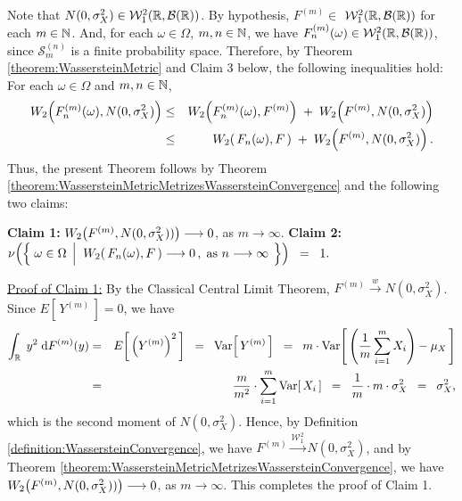 \noindent
Note that $N(0,\sigma^{2}_{X}) \in \mathcal{W}^{2}_{1}\!\left(\mathbb{R},\mathcal{B}(\mathbb{R})\right)$.
By hypothesis, $F^{(m)} \in$ $\mathcal{W}^{2}_{1}\!\left(\mathbb{R},\mathcal{B}(\mathbb{R})\right)$ for each $m \in \mathbb{N}$.
And, for each $\omega \in \Omega$, $m, n \in \mathbb{N}$, we have $F^{(m)}_{n}(\omega) \in \mathcal{W}^{2}_{1}\!\left(\mathbb{R},\mathcal{B}(\mathbb{R})\right)$,
since $\mathcal{S}^{(n)}_{m}$ is a finite probability space.
Therefore, by Theorem \ref{theorem:WassersteinMetric} and Claim 3 below, the following inequalities hold:
For each $\omega \in \Omega$ and $m, n \in \mathbb{N}$,
\begin{eqnarray*}
W_{2}\!\left(F^{(m)}_{n}(\omega),N(0,\sigma^{2}_{X})\right)
& \leq & W_{2}\!\left(F^{(m)}_{n}(\omega),F^{(m)}\right) \;+\; W_{2}\!\left(F^{(m)},N(0,\sigma^{2}_{X})\right) \\
& \leq & W_{2}\!\left(\,F_{n}(\omega),F\,\right) \;+\; W_{2}\!\left(F^{(m)},N(0,\sigma^{2}_{X})\right).
\end{eqnarray*}
Thus, the present Theorem follows by Theorem \ref{theorem:WassersteinMetricMetrizesWassersteinConvergence}
and the following two claims:
\vskip 0.5cm
\begin{center}
\begin{minipage}{5in}
\noindent
\textbf{Claim 1:}\;\; $W_{2}\!\left(F^{(m)},N(0,\sigma^{2}_{X}))\right) \longrightarrow 0$,\; as $m \longrightarrow \infty$.
\vskip 0.3cm
\textbf{Claim 2:}\;\;
	$
	\nu\!\left(\left\{\;
	\omega \in \Omega
	\;\left\vert\;\;
	W_{2}\!\left(\,F_{n}(\omega), F\,\right) \overset{\textnormal{\color{white}X}}{\longrightarrow} 0\,,
	\;\textnormal{as $n\longrightarrow\infty$}
	\right.
	\;\right\}\right)
	\;\; = \;\; 1.
	$
\end{minipage}
\end{center}

\vskip 0.8cm
\noindent
\underline{Proof of Claim 1:}\;\;
By the Classical Central Limit Theorem, $F^{(m)} \overset{w}{\longrightarrow} N(0,\sigma^{2}_{X})$.
Since $E\!\left[\,Y^{(m)}\,\right] = 0$, we have
\begin{eqnarray*}
\int_{\mathbb{R}}\;y^{2}\;\textnormal{d} F^{(m)}(y)
& = & E\!\left[\,\left(Y^{(m)}\right)^{2}\,\right]
\;\; = \;\; \textnormal{Var}\!\left[\, Y^{(m)} \,\right]
\;\; = \;\; m\cdot\textnormal{Var}\!\left[\, \left(\dfrac{1}{m}\sum^{m}_{i=1}X_{i}\right) - \mu_{X} \,\right]
\\
& = & \dfrac{m}{m^{2}}\cdot\sum^{m}_{i=1}\textnormal{Var}\!\left[\,X_{i}\,\right]
\;\; = \;\; \dfrac{1}{m}\cdot m \cdot \sigma^{2}_{X}
\;\; = \;\; \sigma^{2}_{X},
\end{eqnarray*}
which is the second moment of $N(0,\sigma^{2}_{X})$.
Hence, by Definition \ref{definition:WassersteinConvergence}, we have
$F^{(m)} \overset{\mathcal{W}^{2}_{1}}{\longrightarrow} N(0,\sigma^{2}_{X})$,
and by Theorem \ref{theorem:WassersteinMetricMetrizesWassersteinConvergence},
we have
$W_{2}\!\left(F^{(m)},N(0,\sigma^{2}_{X}))\right) \longrightarrow 0$, as $m \longrightarrow \infty$.
This completes the proof of Claim 1.

